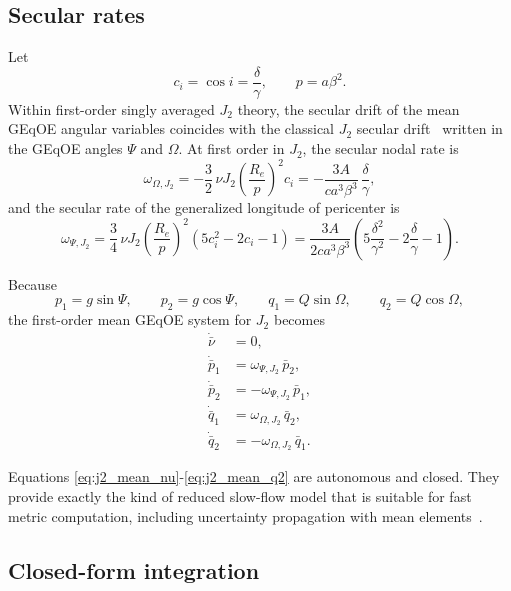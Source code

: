 \documentclass[11pt]{article}
\begin{document}
\subsection{Secular rates}

Let
\begin{equation}
c_i = \cos i = \frac{\delta}{\gamma},
\qquad
p = a\beta^2.
\end{equation}
Within first-order singly averaged $J_2$ theory, the secular drift of the mean
GEqOE angular variables coincides with the classical $J_2$ secular
drift~\cite{brouwer1959,kozai1959} written in the GEqOE angles $\Psi$ and
$\Omega$.
At first order in $J_2$, the secular nodal rate is
\begin{equation}
\omega_{\Omega,J_2}
= -\frac{3}{2}\,\nu J_2
\left(\frac{R_e}{p}\right)^2 c_i
= -\frac{3A}{c a^3 \beta^3}\,\frac{\delta}{\gamma},
\label{eq:OmegaJ2}
\end{equation}
and the secular rate of the generalized longitude of pericenter is
\begin{equation}
\omega_{\Psi,J_2}
= \frac{3}{4}\,\nu J_2
\left(\frac{R_e}{p}\right)^2
\left(5c_i^2 - 2c_i - 1\right)
= \frac{3A}{2c a^3 \beta^3}
\left(
5\frac{\delta^2}{\gamma^2}
- 2\frac{\delta}{\gamma}
- 1
\right).
\label{eq:PsiJ2}
\end{equation}

Because
\begin{equation}
p_1 = g\sin\Psi,
\qquad
p_2 = g\cos\Psi,
\qquad
q_1 = Q\sin\Omega,
\qquad
q_2 = Q\cos\Omega,
\end{equation}
the first-order mean GEqOE system for $J_2$ becomes
\begin{align}
\dot{\bar\nu} &= 0, \label{eq:j2_mean_nu}\\
\dot{\bar p}_1 &= \omega_{\Psi,J_2}\,\bar p_2, \label{eq:j2_mean_p1}\\
\dot{\bar p}_2 &= -\omega_{\Psi,J_2}\,\bar p_1, \label{eq:j2_mean_p2}\\
\dot{\bar q}_1 &= \omega_{\Omega,J_2}\,\bar q_2, \label{eq:j2_mean_q1}\\
\dot{\bar q}_2 &= -\omega_{\Omega,J_2}\,\bar q_1. \label{eq:j2_mean_q2}
\end{align}

Equations \eqref{eq:j2_mean_nu}-\eqref{eq:j2_mean_q2} are autonomous and closed.
They provide exactly the kind of reduced slow-flow model that is suitable for
fast metric computation, including uncertainty propagation with mean
elements~\cite{aristoff2021}.

\subsection{Closed-form integration}
\end{document}
